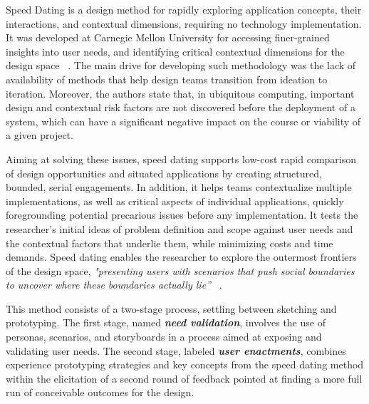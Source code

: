 \label{sec:speeddating}

Speed Dating is a design method for rapidly exploring application concepts, their interactions, and contextual dimensions, requiring no technology implementation. It was developed at Carnegie Mellon University for accessing finer-grained insights into user needs, and identifying critical contextual dimensions for the design space ~\cite{Davidoff2007}. The main drive for developing such methodology was the lack of availability of methods that help design teams transition from ideation to iteration. Moreover, the authors state that, in ubiquitous computing, important design and contextual risk factors are not discovered before the deployment of a system, which can have a significant negative impact on the course or viability of a given project.

Aiming at solving these issues, speed dating supports low-cost rapid comparison of design opportunities and situated applications by creating structured, bounded, serial engagements. In addition, it helps teams contextualize multiple implementations, as well as critical aspects of individual applications, quickly foregrounding potential precarious issues before any implementation. It tests the researcher's initial ideas of problem definition and scope against user needs and the contextual factors that underlie them, while minimizing costs and time demands. Speed dating enables the researcher to explore the outermost frontiers of the design space, \textit{"presenting users with scenarios that push social boundaries to uncover where these boundaries actually lie”} ~\cite{Davidoff2007}.

This method consists of a two-stage process, settling between sketching and prototyping. The first stage, named \textbf{\textit{need validation}}, involves the use of personas, scenarios, and storyboards in a process aimed at exposing and validating user needs. The second stage, labeled \textbf{\textit{user enactments}}, combines experience prototyping strategies and key concepts from the speed dating method within the elicitation of a second round of feedback pointed at finding a more full run of conceivable outcomes for the design.

